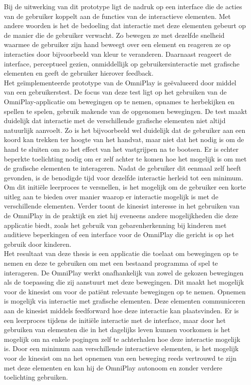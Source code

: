 Bij de uitwerking van dit prototype ligt de nadruk op een interface die de acties van de gebruiker koppelt aan de functies van de interactieve elementen. Met andere woorden is het de bedoeling dat interactie met deze elementen gebeurt op de manier die de gebruiker verwacht. Zo bewegen ze met dezelfde snelheid waarmee de gebruiker zijn hand beweegt over een element en reageren ze op interacties door bijvoorbeeld van kleur te veranderen. Daarnaast reageert de interface, perceptueel gezien, onmiddellijk op gebruikersinteractie met grafische elementen en geeft de gebruiker hierover feedback.\\

Het ge\"implementeerde prototype van de OmniPlay is ge\"evalueerd door middel van een gebruikerstest. De focus van deze test ligt op het gebruiken van de OmniPlay-applicatie om bewegingen op te nemen, opnames te herbekijken en spellen te spelen, gebruik makende van de opgenomen bewegingen. De test maakt duidelijk dat interactie met de verschillende grafische elementen niet altijd natuurlijk aanvoelt. Zo is het bijvoorbeeld wel duidelijk dat de gebruiker aan een koord kan trekken ter hoogte van het handvat, maar niet dat het nodig is om de hand te sluiten om zo het effect van het vastgrijpen na te bootsen. Er is echter beperkte toelichting nodig om er zelf achter te komen hoe het mogelijk is om met de grafische elementen te interageren. Nadat de gebruiker dit eenmaal zelf heeft gevonden, is de benodigde tijd voor dezelfde interactie herleid tot een minimum. Om dit initi\"ele leerproces te versnellen, is het mogelijk om de gebruiker een korte uitleg aan te bieden over manier waarop er interactie mogelijk is met de verschillende elementen. Verder toont de kinesist interesse in het gebruiken van de OmniPlay in de praktijk en ziet hij eveneens andere mogelijkheden die deze applicatie biedt, zoals het gebruik van gebarenherkenning bij kinderen met auditieve beperkingen of een interface voor de OmniPlay die gericht is op het gebruik door kinderen.\\

Het resultaat van deze thesis is een applicatie die toelaat om bewegingen op te nemen en deze te gebruiken om met een bestaand programma of spel te interageren. De OmniPlay werkt onafhankelijk van zowel de gekozen bewegingen als de toepassing die zij aanstuurt met deze bewegingen. Dit maakt het mogelijk voor de kinesist om voor de pati\"ent relevante bewegingen op te nemen. Opnemen is mogelijk via interactie met grafische elementen. Deze elementen communiceren aan de kinesist middels feedforward hoe deze interactie kan plaatsvinden. Er is een leerproces tijdens de initi\"ele interactie met de interface, maar door het gebruiken van elementen die in het dagelijks leven kunnen voorkomen is het mogelijk om na enkele pogingen zelf te achterhalen hoe deze interactie mogelijk is. Door een minimum aan verschillende interactieve elementen, is het mogelijk voor de kinesist om na het opnemen van een beweging reeds vertrouwd te zijn met deze elementen en kan hij de OmniPlay autonoom en zonder verdere toelichting gebruiken.
